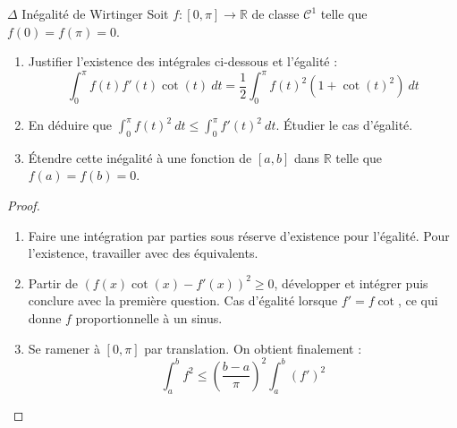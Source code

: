 \documentclass[french,a4paper]{article}
\newcommand{\R}{\mathbb{R}}
\theoremstyle{plain}
\theoremstyle{definition}
\theoremstyle{remark}
\begin{document}
\begin{ex}[Châteaux]{$\Delta$ Inégalité de Wirtinger}
	Soit $f:[0,\pi]\to\R$ de classe $\mathcal{C}^1$ telle que $f(0)=f(\pi)=0$.
	\begin{enumerate}
		\item Justifier l'existence des intégrales ci-dessous et l'égalité : $$\int_{0}^{\pi}f(t)f'(t)\cot(t)\ dt=\frac{1}{2}\int_{0}^{\pi}f(t)^2\left(1+\cot(t)^2\right)\ dt$$
		\item En déduire que $\displaystyle\int_{0}^{\pi}f(t)^2\ dt\leqslant\int_{0}^{\pi}f'(t)^2\ dt$. Étudier le cas d'égalité.
		\item Étendre cette inégalité  à une fonction de $[a,b]$ dans $\R$ telle que $f(a)=f(b)=0$.
	\end{enumerate}
\end{ex}
\begin{proof}
	\begin{enumerate}
		\item Faire une intégration par parties sous réserve d'existence pour l'égalité. Pour l'existence, travailler avec des équivalents.
		\item Partir de $(f(x)\cot(x)-f'(x))^2\geqslant0$, développer et intégrer puis conclure avec la première question. Cas d'égalité lorsque $f'=f\cot$, ce qui donne $f$ proportionnelle à un sinus.
		\item Se ramener à $[0,\pi]$ par translation. On obtient finalement : $$\int_{a}^{b}f^2\leqslant\left(\frac{b-a}{\pi}\right)^2\int_{a}^{b}(f')^2$$
	\end{enumerate}
\end{proof}
\end{document}

